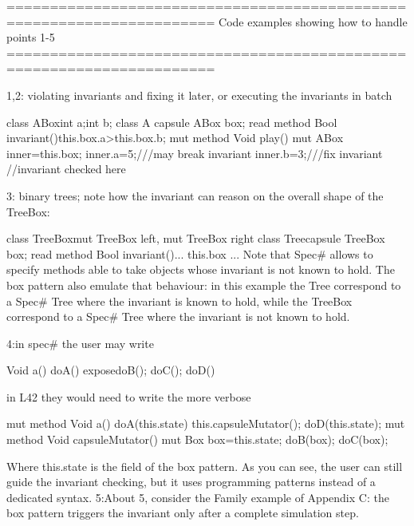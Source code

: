======================================================================
Code examples showing how to handle points 1-5
======================================================================

1,2: violating invariants and fixing it later, or executing the invariants in batch

class ABox{int a;int b;}
class A{
 capsule ABox box;
 read method Bool invariant(){this.box.a>this.box.b;}
 mut method Void play(){
   mut ABox inner=this.box;
   inner.a=5;///may break invariant
   inner.b=3;///fix invariant
   //invariant checked here
   }}
   
3: binary trees; note how the invariant can reason on the overall shape of the TreeBox:

class TreeBox{mut TreeBox left, mut TreeBox right}
class Tree{capsule TreeBox box; 
  read method Bool invariant(){... this.box ...}}
Note that Spec# allows to specify methods able to take objects whose invariant is not known to hold.
The box pattern also emulate that behaviour: in this example the Tree 
correspond to a Spec# Tree where the invariant
is known to hold, while the TreeBox correspond to a Spec# Tree where the invariant is not known to hold.

4:in spec# the user may write 

    Void a() {doA() expose{doB(); doC();} doD()}

in L42 they would need to write the more verbose

    mut method Void a() {doA(this.state) this.capsuleMutator(); doD(this.state);}
    mut method Void capsuleMutator() {mut Box box=this.state; doB(box); doC(box);}
    
Where this.state is the field of the box pattern.
As you can see, the user can still guide the invariant checking, but it uses programming patterns
instead of a dedicated syntax.
5:About 5, consider the Family example of Appendix C: the box pattern triggers the
invariant only after a complete simulation step.
